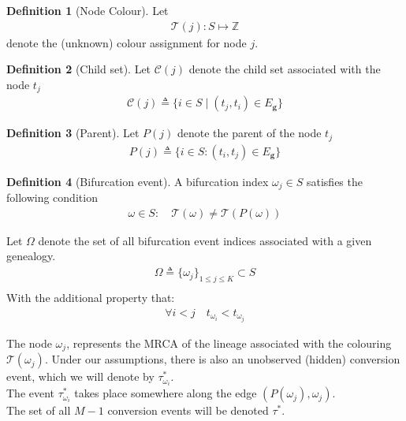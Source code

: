 \documentclass{report}
\newcommand{\Z}{\mathbb{Z}}
\theoremstyle{definition}
\newtheorem{definition}{Definition}[section]
\begin{document}
\begin{definition}[Node Colour]
Let
\begin{gather}
\mathcal{T}(j): S \mapsto \Z
\end{gather}
denote the (unknown) colour assignment for node $j$.
\end{definition}

\begin{definition}[Child set]
Let $\mathcal{C}(j)$ denote the child set associated with the node $t_j$
\begin{gather}
\mathcal{C}(j)\triangleq\{i\in S\mid(t_j, t_i)\in E_{\mathbf{g}}\}
\end{gather}
\end{definition}


\begin{definition}[Parent]
Let $P(j)$ denote the parent of the node $t_j$
\begin{gather}
P(j)\triangleq \{i\in S:(t_i, t_j)\in E_{\mathbf{g}}\}
\end{gather}
\end{definition}

\begin{definition}[Bifurcation event]
A bifurcation index $\omega_j\in S$ satisfies the following condition
\begin{gather}
\omega\in S:\quad \mathcal{T}(\omega) \neq \mathcal{T}(P(\omega))
\end{gather}
\end{definition}

Let $\Omega$ denote the set of all bifurcation event indices associated with a given genealogy.
\begin{gather}
\Omega \triangleq \{\omega_j\}_{1\leq j\leq K}\subset S\\
\end{gather}
With the additional property that:
\begin{gather*}
\forall i<j \quad t_{\omega_i} < t_{\omega_j}
\end{gather*}

The node  $\omega_j$, represents the MRCA of the lineage associated with the colouring $\mathcal{T}(\omega_j)$. Under our assumptions, there is also an unobserved (hidden) conversion event, which we will denote by $\tau^*_{\omega_i}$.\\ The event $\tau^*_{\omega_i}$ takes place somewhere along the edge $(P(\omega_j), \omega_j)$.\\
The set of all $M-1$ conversion events will be denoted $\tau^*$.
\end{document}
